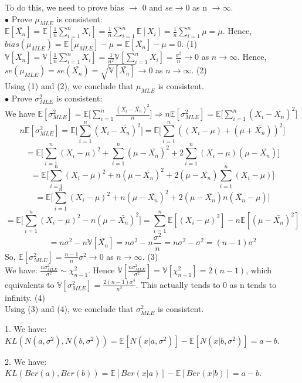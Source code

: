 \documentclass[10pt]{article}
\newenvironment{problem}[2][Problem]{\begin{trivlist}
\item[\hskip \labelsep {\bfseries #1}\hskip \labelsep {\bfseries #2.}]}{\end{trivlist}}
\begin{document}
\begin{problem}{2}
To do this, we need to prove bias $\rightarrow$ 0 and $se \rightarrow 0$ as n $\rightarrow \infty$.\\
$\bullet$ Prove $\mu_{MLE}$ is consistent:
$\mathbb{E}[\bar{X_n}]=\mathbb{E}[\frac{1}{n}\sum_{i=1}^{n}X_i]=\frac{1}{n}\sum_{i=1}^{n}\mathbb{E}[X_i]=\frac{1}{n}\sum_{i=1}^{n}\mu=\mu$. Hence, $bias(\mu_{MLE})=\mathbb{E}[\mu_{MLE}]-\mu=\mathbb{E}[\bar{X_n}]-\mu=0$. (1)\\
$\mathbb{V}[\bar{X_n}]=\mathbb{V}[\frac{1}{n}\sum_{i=1}^{n}X_i]=\frac{1}{n^2}\mathbb{V}[\sum_{i=1}^{n}X_i]=\frac{\sigma^2}{n} \longrightarrow 0$ as $n \longrightarrow \infty$. Hence, $se(\mu_{MLE})=se(\bar{X_n})=\sqrt{\mathbb{V}[\bar{X_n}]} \longrightarrow 0$ as $n \longrightarrow \infty$. (2)\\
Using (1) and (2), we conclude that $\mu_{MLE}$ is consistent.\\
$\bullet$ Prove $\sigma_{MLE}^2$ is consistent:\\
We have $\mathbb{E}[\sigma_{MLE}^2]=\mathbb{E}\Big[\sum_{i=1}^{n}\frac{(X_i-\bar{X_n})^2}{n} \Big]\Rightarrow n\mathbb{E}[\sigma_{MLE}^2]=\mathbb{E}\Big[\sum_{i=1}^{n}(X_i-\bar{X_n})^2 \Big]$\\
\[n\mathbb{E}[\sigma_{MLE}^2]=\mathbb{E}\Big[\sum_{i=1}^{n}(X_i-\bar{X_n})^2 \Big]=\mathbb{E}\Big[\sum_{i=1}^{n}((X_i-\mu)+(\mu+\bar{X_n}))^2 \Big] \]
\[=\mathbb{E}\Big[ \sum_{i=1}^{n}(X_i-\mu)^2 + \sum_{i=1}^{n}(\mu-\bar{X_n})^2 + 2\sum_{i=1}^{n}(X_i-\mu)(\mu-\bar{X_n}) \Big] \]
\[=\mathbb{E}\Big[ \sum_{i=1}^{n}(X_i-\mu)^2 +n(\mu-\bar{X_n})^2 + 2(\mu-\bar{X_n})\sum_{i=1}^{n}(X_i-\mu) \Big] \]
\[=\mathbb{E}\Big[ \sum_{i=1}^{n}(X_i-\mu)^2 +n(\mu-\bar{X_n})^2 +2(\mu-\bar{X_n})n(\bar{X_n}-\mu) \Big] \]
\[=\mathbb{E}\Big[\sum_{i=1}^{n}(X_i-\mu)^2-n(\mu-\bar{X_n})^2  \Big]=\sum_{i=1}^{n}\mathbb{E}[(X_i-\mu)^2]-n\mathbb{E}[(\mu-\bar{X_n})^2] \]
\[=n\sigma^2-n\mathbb{V}[\bar{X_n}]=n\sigma^2-n\frac{\sigma^2}{n}=n\sigma^2-\sigma^2=(n-1)\sigma^2 \]
So, $\mathbb{E}[\sigma_{MLE}^2]=\frac{n-1}{n}\sigma^2 \longrightarrow 0$ as $n \longrightarrow \infty$. (3)\\
We have: $\frac{n\sigma_{MLE}^{2}}{\sigma^2} \sim \chi_{n-1}^2$. Hence $\mathbb{V}[\frac{n\sigma_{MLE}^{2}}{\sigma^2}]=\mathbb{V}[\chi_{n-1}^2]=2(n-1)$, which equivalents to $\mathbb{V}[\sigma_{MLE}^2]=\frac{2(n-1)\sigma^4}{n^2}$. This actually tends to 0 as n tends to infinity. (4)\\
Using (3) and (4), we conclude that  $\sigma_{MLE}^2$ is consistent.




\end{problem}
\begin{problem}{3}
\item 1.
We have: $KL(N(a, \sigma^2), N(b, \sigma^2))=\mathbb{E}[N(x|a, \sigma^2)]-\mathbb{E}[N(x| b, \sigma^2)]=a-b$.\\
\item 2.
We have: $KL(Ber(a), Ber(b))=\mathbb{E}[Ber(x|a)]-\mathbb{E}[Ber(x| b)]=a-b$.\\

\end{problem}
\end{document}
